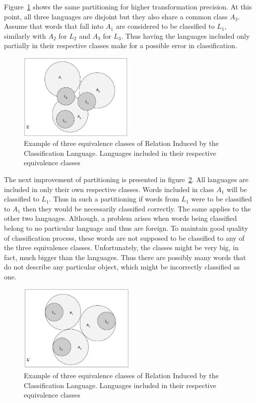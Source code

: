 \documentclass{mini}
\begin{document}
Figure~\ref{fig:eq_classes_high_precision} shows the same partitioning for higher transformation precision. At this point, all three languages are disjoint but they also share a common class $A_{3}$. Assume that words that fall into $A_{1}$ are considered to be classified to $L_{1}$, similarly with $A_{2}$ for $L_{2}$ and $A_{3}$ for $L_{3}$. Thus having the languages included only partially in their respective classes make for a possible error in classification.

\begin{figure}[H]
    \centering
    \includegraphics[width=0.5\textwidth]{./images/equivalence_classes_high_pt.jpg}
    \caption{Example of three equivalence classes of Relation Induced by the Classification Language. Languages included in their respective equivalence classes}
    \label{fig:eq_classes_high_precision}
\end{figure}

The next improvement of partitioning is presented in figure~\ref{fig:eq_classes}. All languages are included in only their own respective classes. Words included in class $A_{1}$ will be classified to $L_{1}$. Thus in such a partitioning if words from $L_{1}$ were to be classified to $A_{1}$ then they would be necessarily classified correctly. The same applies to the other two languages. Although, a problem arises when words being classified belong to no particular language and thus are foreign. To maintain good quality of classification process, these words are not supposed to be classified to any of the three equivalence classes. Unfortunately, the classes might be very big, in fact, much bigger than the languages. Thus there are possibly many words that do not describe any particular object, which might be incorrectly classified as one. 

\begin{figure}[H]
    \centering
    \includegraphics[width=0.5\textwidth]{./images/equivalence_classes.jpg}
    \caption{Example of three equivalence classes of Relation Induced by the Classification Language. Languages included in their respective equivalence classes}
    \label{fig:eq_classes}
\end{figure}
\end{document}
